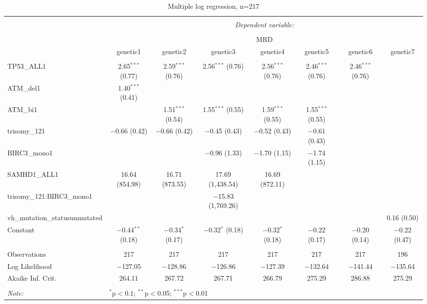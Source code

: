 \documentclass[a4paper,11pt]{article}
\begin{document}
\begin{table}[!htbp] \centering 
  \caption{Multiple log regression, n=217} 
  \label{} 
\tiny 
\begin{tabular}{@{\extracolsep{5pt}}lccccccc} 
\\[-1.8ex]\hline 
\hline \\[-1.8ex] 
 & \multicolumn{7}{c}{\textit{Dependent variable:}} \\ 
\cline{2-8} 
\\[-1.8ex] & \multicolumn{7}{c}{MRD} \\ 
 & genetic1 & genetic2 & genetic3 & genetic4 & genetic5 & genetic6 & genetic7 \\ 
\hline \\[-1.8ex] 
 TP53\_ALL1 & 2.65$^{***}$ (0.77) & 2.59$^{***}$ (0.76) & 2.56$^{***}$ (0.76) & 2.56$^{***}$ (0.76) & 2.46$^{***}$ (0.76) & 2.46$^{***}$ (0.76) &  \\ 
  ATM\_del1 & 1.40$^{***}$ (0.41) &  &  &  &  &  &  \\ 
  ATM\_bi1 &  & 1.51$^{***}$ (0.54) & 1.55$^{***}$ (0.55) & 1.59$^{***}$ (0.55) & 1.55$^{***}$ (0.55) &  &  \\ 
  trisomy\_121 & $-$0.66 (0.42) & $-$0.66 (0.42) & $-$0.45 (0.43) & $-$0.52 (0.43) & $-$0.61 (0.43) &  &  \\ 
  BIRC3\_mono1 &  &  & $-$0.96 (1.33) & $-$1.70 (1.15) & $-$1.74 (1.15) &  &  \\ 
  SAMHD1\_ALL1 & 16.64 (854.98) & 16.71 (873.55) & 17.69 (1,438.54) & 16.69 (872.11) &  &  &  \\ 
  trisomy\_121:BIRC3\_mono1 &  &  & $-$15.83 (1,769.26) &  &  &  &  \\ 
  vh\_mutation\_statusunmutated &  &  &  &  &  &  & 0.16 (0.50) \\ 
  Constant & $-$0.44$^{**}$ (0.18) & $-$0.34$^{*}$ (0.17) & $-$0.32$^{*}$ (0.18) & $-$0.32$^{*}$ (0.18) & $-$0.22 (0.17) & $-$0.20 (0.14) & $-$0.22 (0.47) \\ 
 \hline \\[-1.8ex] 
Observations & 217 & 217 & 217 & 217 & 217 & 217 & 196 \\ 
Log Likelihood & $-$127.05 & $-$128.86 & $-$126.86 & $-$127.39 & $-$132.64 & $-$141.44 & $-$135.64 \\ 
Akaike Inf. Crit. & 264.11 & 267.72 & 267.71 & 266.79 & 275.29 & 286.88 & 275.29 \\ 
\hline 
\hline \\[-1.8ex] 
\textit{Note:}  & \multicolumn{7}{l}{$^{*}$p$<$0.1; $^{**}$p$<$0.05; $^{***}$p$<$0.01} \\ 
\end{tabular} 
\end{table}  
\newpage
\end{document}
